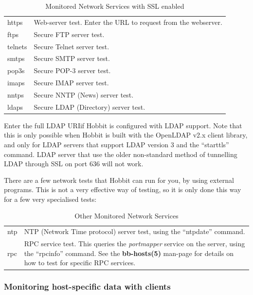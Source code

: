 \begin{table} \centering \caption{Monitored Network Services with SSL enabled} \label{Monitored_Network_Services_SSL}
\begin{tabular}{l|l}
https & Web-server test. Enter the URL to request from the webserver.\\ 
ftps & Secure FTP server test. \\
telnets & Secure Telnet server test. \\
smtps & Secure SMTP server test. \\
pop3s & Secure POP-3 server test. \\
imaps & Secure IMAP server test. \\
nntps & Secure NNTP (News) server test. \\
ldaps & Secure LDAP (Directory) server test.
\end{tabular}

\end{table}

Enter the full LDAP URIif Hobbit is configured with LDAP support. Note that this is only
possible when Hobbit is built with the OpenLDAP v2.x client library,
and only for LDAP servers that support LDAP version 3 and the
``starttls'' command. LDAP server that use the older non-standard
method of tunnelling LDAP through SSL on port 636 will not work.





 There are a few network tests that Hobbit can run for you, by using
 external programs. This is not a very effective way of testing, so it
 is only done this way for a few very specialised tests:


\begin{table} \centering \caption{Other Monitored Network Services} \label{Other_Monitored_Network_Services}
\begin{tabular}{l|l}
ntp & NTP (Network Time protocol) server test, using the ``ntpdate'' command. \\
rpc & RPC service test. This queries the \emph{portmapper} service on
the server, using the ``rpcinfo'' command. See the
\textbf{bb-hosts(5)} man-page for details on how to test for specific
RPC services.

\end{tabular}
\end{table}

\subsubsection{Monitoring host-specific data with clients}


